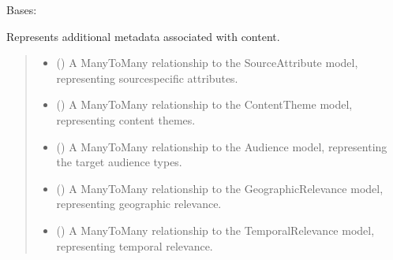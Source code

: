 \documentclass[letterpaper,10pt,english]{sphinxmanual}
\begin{document}
\begin{fulllineitems}
\label{\detokenize{source/meta_models_management:meta_models_management.models.AdditionalMetadata}}
\pysigstartsignatures
{}
\pysigstopsignatures
\sphinxAtStartPar
Bases: 

\sphinxAtStartPar
Represents additional metadata associated with content.
\begin{quote}\begin{description}
\begin{itemize}
\item {} 
\sphinxAtStartPar
{} () \textendash{} A ManyToMany relationship to the SourceAttribute model, representing source\sphinxhyphen{}specific attributes.

\item {} 
\sphinxAtStartPar
{} () \textendash{} A ManyToMany relationship to the ContentTheme model, representing content themes.

\item {} 
\sphinxAtStartPar
{} () \textendash{} A ManyToMany relationship to the Audience model, representing the target audience types.

\item {} 
\sphinxAtStartPar
{} () \textendash{} A ManyToMany relationship to the GeographicRelevance model, representing geographic relevance.

\item {} 
\sphinxAtStartPar
{} () \textendash{} A ManyToMany relationship to the TemporalRelevance model, representing temporal relevance.


\end{itemize}
\end{description}
\end{quote}
\end{fulllineitems}
\end{document}
